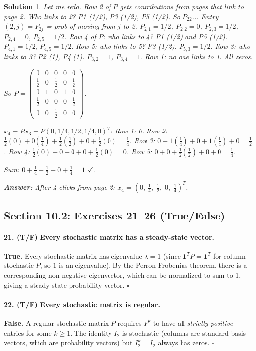 \documentclass[11pt,a4paper]{article}
\theoremstyle{sol}
\newtheorem*{solution}{Solution}
\begin{document}
\begin{solution}
Let me redo. Row 2 of $P$ gets contributions from pages that link to page 2. Who links to 2? P1 (1/2), P3 (1/2), P5 (1/2). So $P_{22}$... Entry $(2,j)=P_{2j}$ = prob of moving from $j$ to 2. $P_{2,1}=1/2$, $P_{2,2}=0$, $P_{2,3}=1/2$, $P_{2,4}=0$, $P_{2,5}=1/2$.
Row 4 of $P$: who links to 4? P1 (1/2) and P5 (1/2). $P_{4,1}=1/2$, $P_{4,5}=1/2$.
Row 5: who links to 5? P3 (1/2). $P_{5,3}=1/2$.
Row 3: who links to 3? P2 (1), P4 (1). $P_{3,2}=1$, $P_{3,4}=1$.
Row 1: no one links to 1. All zeros.

So $P=\begin{pmatrix}0&0&0&0&0\\\frac12&0&\frac12&0&\frac12\\0&1&0&1&0\\\frac12&0&0&0&\frac12\\0&0&\frac12&0&0\end{pmatrix}$.

$x_4=Px_3=P(0,1/4,1/2,1/4,0)^T$:
Row 1: 0. Row 2: $\frac12(0)+0(\frac14)+\frac12(\frac12)+0+\frac12(0)=\frac14$. Row 3: $0+1(\frac14)+0+1(\frac14)+0=\frac12$. Row 4: $\frac12(0)+0+0+0+\frac12(0)=0$. Row 5: $0+0+\frac12(\frac12)+0+0=\frac14$.

Sum: $0+\frac14+\frac12+0+\frac14=1$ $\checkmark$.

\textbf{Answer:} After 4 clicks from page 2: $x_4=(0,\;\tfrac{1}{4},\;\tfrac{1}{2},\;0,\;\tfrac{1}{4})^T$.
\end{solution}

\clearpage
\subsection{Section 10.2: Exercises 21--26 (True/False)}

\paragraph{21. (T/F) Every stochastic matrix has a steady-state vector.}
\textbf{True.} Every stochastic matrix has eigenvalue $\lambda=1$ (since $\mathbf{1}^T P=\mathbf{1}^T$ for column-stochastic $P$, so $1$ is an eigenvalue). By the Perron-Frobenius theorem, there is a corresponding non-negative eigenvector, which can be normalized to sum to 1, giving a steady-state probability vector. $\square$

\paragraph{22. (T/F) Every stochastic matrix is regular.}
\textbf{False.} A regular stochastic matrix $P$ requires $P^k$ to have all \emph{strictly positive} entries for some $k\geq1$. The identity $I_2$ is stochastic (columns are standard basis vectors, which are probability vectors) but $I_2^k=I_2$ always has zeros. $\square$
\end{document}

